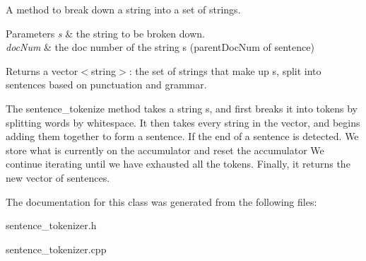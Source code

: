 A method to break down a string into a set of strings. 


\begin{DoxyParams}{Parameters}
{\em s} & the string to be broken down. \\
\hline
{\em doc\+Num} & the doc number of the string s (parent\+Doc\+Num of sentence) \\
\hline
\end{DoxyParams}
\begin{DoxyReturn}{Returns}
a vector$<$string$>$\+: the set of strings that make up s, split into sentences based on punctuation and grammar.
\end{DoxyReturn}
The sentence\+\_\+tokenize method takes a string s, and first breaks it into tokens by splitting words by whitespace. It then takes every string in the vector, and begins adding them together to form a sentence. If the end of a sentence is detected. We store what is currently on the accumulator and reset the accumulator We continue iterating until we have exhausted all the tokens. Finally, it returns the new vector of sentences. 

The documentation for this class was generated from the following files\+:\begin{DoxyCompactItemize}
\item 
sentence\+\_\+tokenizer.\+h\item 
sentence\+\_\+tokenizer.\+cpp\end{DoxyCompactItemize}
